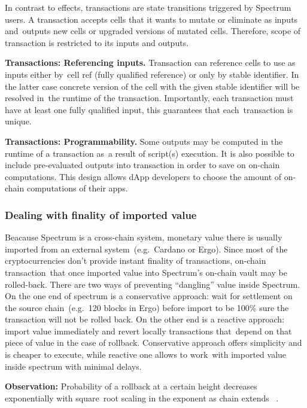 In contrast to effects, transactions are state transitions triggered by Spectrum users.
A transaction accepts cells that it wants to mutate or eliminate as inputs and\
outputs new cells or upgraded versions of mutated cells.
Therefore, scope of transaction is restricted to its inputs and outputs.

\textbf{Transactions: Referencing inputs.} Transaction can reference cells to use as inputs either by\
cell ref (fully qualified reference) or only by stable identifier.
In the latter case concrete version of the cell with the given stable identifier will be resolved in\
the runtime of the transaction.
Importantly, each transaction must have at least one fully qualified input, this guarantees that each\
transaction is unique.

\textbf{Transactions: Programmability.} Some outputs may be computed in the runtime of a transaction as\
a result of script(s) execution.
It is also possible to include pre-evaluated outputs into transaction in order to save on on-chain computations.
This design allows dApp developers to choose the amount of on-chain computations of their apps.

\subsubsection{Dealing with finality of imported value}\label{subsubsec:dealing-with-finality-of-imported-value}

Beacause Spectrum is a cross-chain system, monetary value there is usually imported from an external system\
(e.g.\ Cardano or Ergo).
Since most of the cryptocurrencies don't provide instant finality of transactions, on-chain transaction\
that once imported value into Spectrum's on-chain vault may be rolled-back.
There are two ways of preventing \enquote{dangling} value inside Spectrum.
On the one end of spectrum is a conservative approach: wait for settlement on the source chain\
(e.g.\ 120 blocks in Ergo) before import to be 100\% sure the transaction will not be rolled back.
On the other end is a reactive approach: import value immediately and revert locally transactions that\
depend on that piece of value in the case of rollback.
Conservative approach offers simplicity and is cheaper to execute, while reactive one allows to work\
with imported value inside spectrum with minimal delays.

\textbf{Observation:} Probability of a rollback at a certain height decreases exponentially with square\
root scaling in the exponent as chain extends ~\cite{cryptoeprint:2017/573}.

